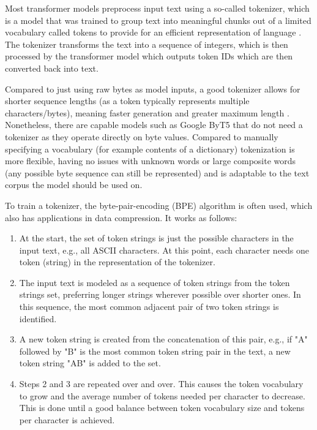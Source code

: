 Most transformer models preprocess input text using a so-called tokenizer, which is a model that was trained to group text into meaningful chunks out of a limited vocabulary called tokens to provide for an efficient representation of language \cite{subwordunits}. The tokenizer transforms the text into a sequence of integers, which is then processed by the transformer model which outputs token IDs which are then converted back into text.

Compared to just using raw bytes as model inputs, a good tokenizer allows for shorter sequence lengths (as a token typically represents multiple characters/bytes), meaning faster generation and greater maximum length \cite{tokenizerchoice}. Nonetheless, there are capable models such as Google ByT5 \cite{xue2022byt5} that do not need a tokenizer as they operate directly on byte values.
Compared to manually specifying a vocabulary (for example contents of a dictionary) tokenization is more flexible, having no issues with unknown words or large composite words (any possible byte sequence can still be represented) and is adaptable to the text corpus the model should be used on.

To train a tokenizer, the byte-pair-encoding (BPE) algorithm \cite{subwordunits} is often used, which also has applications in data compression. It works as follows:

\begin{enumerate}
	\item At the start, the set of token strings is just the possible characters in the input text, e.g., all ASCII characters. At this point, each character needs one token (string) in the representation of the tokenizer.
	\item The input text is modeled as a sequence of token strings from the token strings set, preferring longer strings wherever possible over shorter ones. In this sequence, the most common adjacent pair of two token strings is identified.
	\item A new token string is created from the concatenation of this pair, e.g., if "A" followed by "B" is the most common token string pair in the text, a new token string "AB" is added to the set.
	\item Steps 2 and 3 are repeated over and over. This causes the token vocabulary to grow and the average number of tokens needed per character to decrease. This is done until a good balance between token vocabulary size and tokens per character is achieved.
\end{enumerate}

